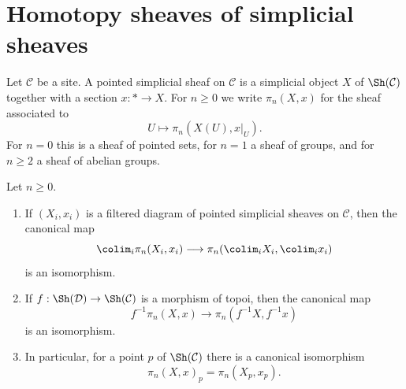 
\section{Homotopy sheaves of simplicial sheaves}
\label{section-illusie-I-homotopy-sheaves}

\noindent
Let $\mathcal{C}$ be a site. A pointed simplicial sheaf on $\mathcal{C}$
is a simplicial object $X$ of $\Sh(\mathcal{C})$ together with a section
$x : * \to X$. For $n \geq 0$ we write
$\pi_n(X, x)$ for the sheaf associated to
$$
U \longmapsto \pi_n(X(U), x|_U).
$$
For $n = 0$ this is a sheaf of pointed sets, for $n = 1$ a sheaf of
groups, and for $n \geq 2$ a sheaf of abelian groups.

\begin{lemma}
\label{lemma-illusie-I-homotopy-sheaves-colimits-pullback}
Let $n \geq 0$.
\begin{enumerate}
\item If $(X_i, x_i)$ is a filtered diagram of pointed simplicial sheaves
on $\mathcal{C}$, then the canonical map
$$
\colim_i \pi_n(X_i, x_i)
\longrightarrow
\pi_n(\colim_i X_i, \colim_i x_i)
$$
is an isomorphism.
\item If
$f : \Sh(\mathcal{D}) \to \Sh(\mathcal{C})$
is a morphism of topoi, then the canonical map
$$
f^{-1}\pi_n(X, x)
\longrightarrow
\pi_n(f^{-1}X, f^{-1}x)
$$
is an isomorphism.
\item In particular, for a point $p$ of $\Sh(\mathcal{C})$ there is a
canonical isomorphism
$$
\pi_n(X, x)_p = \pi_n(X_p, x_p).
$$
\end{enumerate}
\end{lemma}

